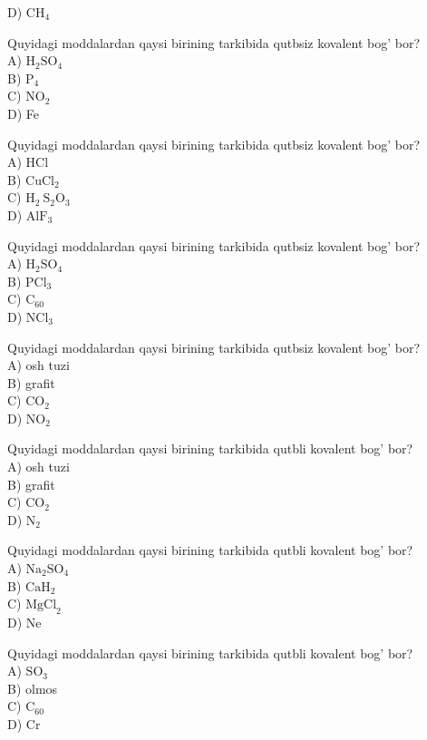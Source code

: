D) $\mathrm{CH}_{4}$
  \item Quyidagi moddalardan qaysi birining tarkibida qutbsiz kovalent bog' bor?\\
A) $\mathrm{H}_{2} \mathrm{SO}_{4}$\\
B) $\mathrm{P}_{4}$\\
C) $\mathrm{NO}_{2}$\\
D) Fe
  \item Quyidagi moddalardan qaysi birining tarkibida qutbsiz kovalent bog' bor?\\
A) HCl\\
B) $\mathrm{CuCl}_{2}$\\
C) $\mathrm{H}_{2} \mathrm{~S}_{2} \mathrm{O}_{3}$\\
D) $\mathrm{AlF}_{3}$
  \item Quyidagi moddalardan qaysi birining tarkibida qutbsiz kovalent bog' bor?\\
A) $\mathrm{H}_{2} \mathrm{SO}_{4}$\\
B) $\mathrm{PCl}_{3}$\\
C) $\mathrm{C}_{60}$\\
D) $\mathrm{NCl}_{3}$
  \item Quyidagi moddalardan qaysi birining tarkibida qutbsiz kovalent bog' bor?\\
A) osh tuzi\\
B) grafit\\
C) $\mathrm{CO}_{2}$\\
D) $\mathrm{NO}_{2}$
  \item Quyidagi moddalardan qaysi birining tarkibida qutbli kovalent bog' bor?\\
A) osh tuzi\\
B) grafit\\
C) $\mathrm{CO}_{2}$\\
D) $\mathrm{N}_{2}$
  \item Quyidagi moddalardan qaysi birining tarkibida qutbli kovalent bog' bor?\\
A) $\mathrm{Na}_{2} \mathrm{SO}_{4}$\\
B) $\mathrm{CaH}_{2}$\\
C) $\mathrm{MgCl}_{2}$\\
D) Ne
  \item Quyidagi moddalardan qaysi birining tarkibida qutbli kovalent bog' bor?\\
A) $\mathrm{SO}_{3}$\\
B) olmos\\
C) $\mathrm{C}_{60}$\\
D) Cr
